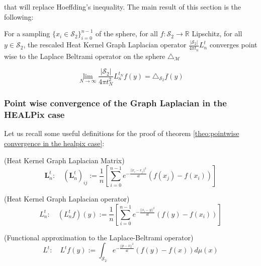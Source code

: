 that will replace Hoeffding's inequality.
The main result of this section is the following:
\begin{theorem}
	For a sampling $\{x_i\in\mathcal S_2\}_{i=0}^{n-1}$ of the sphere, for all $f: \mathcal S_2 \rightarrow \mathbb R$ Lipschitz, for all $y\in\mathcal S_2$, the rescaled Heat Kernel Graph Laplacian operator $\frac{|\mathcal S_2|}{4\pi t_n}L^t_n$ converges point wise to the Laplace Beltrami operator on the sphere $\triangle_{\mathcal M}$
	
	$$ \lim_{N\to\infty}\frac{|\mathcal S_2|}{4\pi t_N^2} L_n^{t_N}f(y) =  \triangle_{\mathcal S_2}f(y) $$
	\label{theo:pointwise convergence in the healpix case}
\end{theorem}

\subsubsection{Point wise convergence of the Graph Laplacian in the HEALPix case}

Let us recall some useful definitions for the proof of theorem \ref{theo:pointwise convergence in the healpix case}:

\begin{definition}{}(Heat Kernel Graph Laplacian Matrix)\\
	\label{def:Heat Kernel Graph Laplacian Matrix}
	$$\mathbf L_n^t:\quad(\mathbf L_n^t)_{ij} := \frac{1}{n}\left[ \sum_{i=0}^{n-1} e^{-\frac{||x_i-x_j||^2}{4t}}\left(f(x_j)-f(x_i)\right)\right]$$
\end{definition}
\begin{definition}{}(Heat Kernel Graph Laplacian operator)\\
	\label{def:Heat Kernel Graph Laplacian operator}
	$$L_n^t:\quad(L_n^tf)(y) := \frac{1}{n}\left[ \sum_{i=0}^{n-1} e^{-\frac{||x_i-y||^2}{4t}}\left(f(y)-f(x_i)\right)\right]$$
\end{definition}
\begin{definition}{}(Functional approximation to the Laplace-Beltrami operator)\\ \label{eq: my L^t}
	\label{def:Functional approximation to the Laplace-Beltrami operator}
	$$L^t:\quad L^tf(y) := \int_{\mathcal S_2}e^{-\frac{||p-x||^2}{4t}}\left(f(y)-f(x)\right)d\mu(x)$$
\end{definition}


